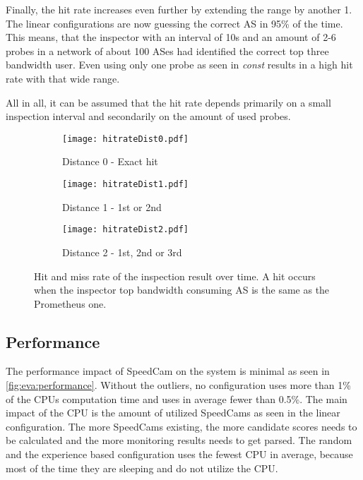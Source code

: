 \documentclass[thesis.tex]{subfiles}
\begin{document}
Finally, the hit rate increases even further by extending the range by another 1. The linear configurations are now guessing the correct AS in 95\% of the time. This means, that the inspector with an interval of 10s and an amount of 2-6 probes in a network of about 100 ASes had identified the correct top three bandwidth user. Even using only one probe as seen in \textit{const} results in a high hit rate with that wide range.

All in all, it can be assumed that the hit rate depends primarily on a small inspection interval and secondarily on the amount of used probes.
\begin{figure}
	\centering
	\begin{subfigure}{0.8\linewidth}
		\centering
		\texttt{[image: hitrateDist0.pdf]}
		\caption{Distance 0 - Exact hit}
		\label{fig:eva:hitrate:0}
	\end{subfigure}
	\hfill
	\begin{subfigure}{0.8\linewidth}
		\centering
		\texttt{[image: hitrateDist1.pdf]}
		\caption{Distance 1 - 1st or 2nd}
		\label{fig:eva:hitrate:1}
	\end{subfigure}
	\hfill	
	\begin{subfigure}{0.8\linewidth}
		\centering
		\texttt{[image: hitrateDist2.pdf]}
		\caption{Distance 2 - 1st, 2nd or 3rd}
		\label{fig:eva:hitrate:2}
	\end{subfigure}
	\caption{Hit and miss rate of the inspection result over time. A hit occurs when the inspector top bandwidth consuming AS is the same as the Prometheus one.}
	\label{fig:eva:hitrate}
\end{figure}


\subsection{Performance} \label{sec:eva:performance}

The performance impact of SpeedCam on the system is minimal as seen in \autoref{fig:eva:performance}. Without the outliers, no configuration uses more than 1\% of the CPUs computation time and uses in average fewer than 0.5\%. The main impact of the CPU is the amount of utilized SpeedCams as seen in the linear configuration. The more SpeedCams existing, the more candidate scores needs to be calculated and the more monitoring results needs to get parsed. The random and the experience based configuration uses the fewest CPU in average, because most of the time they are sleeping and do not utilize the CPU.
\end{document}
